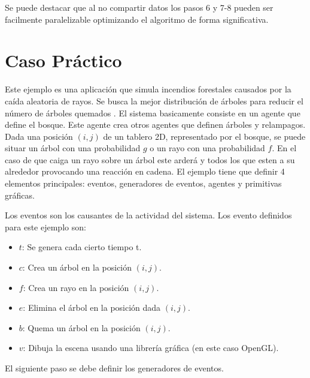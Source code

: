 \documentclass[runningheads]{llncs}
\begin{document}
	Se puede destacar que al no compartir datos los pasos 6 y 7-8 pueden ser facilmente paralelizable optimizando el algoritmo de forma significativa.
	
\section{Caso Pr\'actico
\label{sec:casoPractico}}

Este ejemplo es una aplicaci\'on que simula incendios forestales causados por la ca\'ida aleatoria de rayos. Se busca la mejor distribuci\'on de \'arboles para reducir el n\'umero de \'arboles quemados \cite{John2007}. El sistema basicamente consiste en un agente que define el bosque. Este agente crea otros agentes que definen \'arboles y relampagos. Dada una posici\'on $(i,j)$ de un tablero 2D, representado por el bosque, se puede situar un \'arbol con una probabilidad $g$ o un rayo con una probabilidad $f$. En el caso de que caiga un rayo sobre un \'arbol este arder\'a y todos los que esten a su alrededor provocando una reacci\'on en cadena. El ejemplo tiene que definir 4 elementos principales: eventos, generadores de eventos, agentes y primitivas gr\'aficas.

Los eventos son los causantes de la actividad del sistema. Los evento definidos para este ejemplo son:

\begin{itemize}
    \item $t$: Se genera cada cierto tiempo t.

    \item $c$: Crea un \'arbol en la posici\'on $(i, j)$.

    \item $f$: Crea un rayo en la posici\'on $(i, j)$.

    \item $e$: Elimina el \'arbol en la posici\'on dada $(i, j)$.

    \item $b$: Quema un \'arbol en la posici\'on $(i, j)$.

    \item $v$: Dibuja la escena usando una librer\'ia gr\'afica (en este caso OpenGL).
\end{itemize}

El siguiente paso se debe definir los generadores de eventos.
\end{document}
